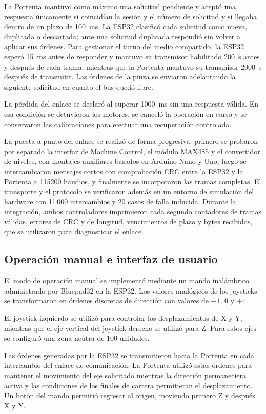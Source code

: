La Portenta mantuvo como máximo una solicitud pendiente y aceptó una respuesta únicamente si coincidían la sesión y el número de solicitud y si llegaba dentro de un plazo de 100~ms. La ESP32 clasificó cada solicitud como nueva, duplicada o descartada; ante una solicitud duplicada respondió sin volver a aplicar sus órdenes. Para gestionar el turno del medio compartido, la ESP32 esperó 15~ms antes de responder y mantuvo su transmisor habilitado 200~\textmu s antes y después de cada trama, mientras que la Portenta mantuvo su transmisor 2000~\textmu s después de transmitir. Las órdenes de la pinza se enviaron adelantando la siguiente solicitud en cuanto el bus quedó libre.

La pérdida del enlace se declaró al superar 1000~ms sin una respuesta válida. En esa condición se detuvieron los motores, se canceló la operación en curso y se conservaron las calibraciones para efectuar una recuperación controlada.

La puesta a punto del enlace se realizó de forma progresiva: primero se probaron por separado la interfaz de Machine Control, el módulo MAX485 y el convertidor de niveles, con montajes auxiliares basados en Arduino Nano y Uno; luego se intercambiaron mensajes cortos con comprobación CRC entre la ESP32 y la Portenta a 115200 baudios, y finalmente se incorporaron las tramas completas. El transporte y el protocolo se verificaron además en un entorno de simulación del hardware con 11\,000 intercambios y 20 casos de falla inducida. Durante la integración, ambos controladores imprimieron cada segundo contadores de tramas válidas, errores de CRC y de longitud, vencimientos de plazo y bytes recibidos, que se utilizaron para diagnosticar el enlace.


\subsection{Operación manual e interfaz de usuario}

El modo de operación manual se implementó mediante un mando inalámbrico administrado por Bluepad32 en la ESP32. Los valores analógicos de los joysticks se transformaron en órdenes discretas de dirección con valores de $-1$, $0$ y $+1$.

El joystick izquierdo se utilizó para controlar los desplazamientos de X y Y, mientras que el eje vertical del joystick derecho se utilizó para Z. Para estos ejes se configuró una zona neutra de 100 unidades.

Las órdenes generadas por la ESP32 se transmitieron hacia la Portenta en cada intercambio del enlace de comunicación. La Portenta utilizó estas órdenes para mantener el movimiento del eje solicitado mientras la dirección permaneciera activa y las condiciones de los finales de carrera permitieran el desplazamiento. Un botón del mando permitió regresar al origen, moviendo primero Z y después X y Y.

